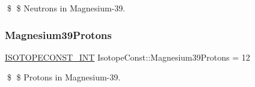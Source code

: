 \$ \$ Neutrons in Magnesium-\/39. \mbox{\label{group___isotope_const-_magnesium-_mg39_ga30fccc4aea21be54cfb5aa1889aeffb6}} 
\subsubsection{\texorpdfstring{Magnesium39\+Protons}{Magnesium39Protons}}
{\footnotesize\ttfamily \mbox{\hyperlink{group___isotope_const-_macros_ga5f18360b3e99483a35c32d789e62621c}{I\+S\+O\+T\+O\+P\+E\+C\+O\+N\+S\+T\+\_\+\+I\+NT}} Isotope\+Const\+::\+Magnesium39\+Protons = 12}

\$ \$ Protons in Magnesium-\/39. 